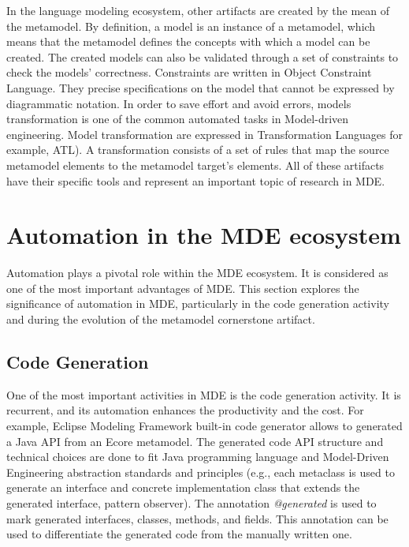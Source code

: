 In the language modeling ecosystem, other artifacts are created by the mean of the metamodel. By definition, a model is an instance of a metamodel, which means that the metamodel defines the concepts with which a model can be created. The created models can also be validated through a set of constraints to check the models' correctness. Constraints are written in Object Constraint Language. They precise specifications on the model that cannot be  expressed by diagrammatic notation. In order to save effort and avoid errors, models transformation is one of the common automated tasks in Model-driven engineering. Model transformation are expressed in  Transformation Languages for example, ATL). A transformation consists of a set of rules that map the source metamodel elements to the metamodel target’s elements. All of these artifacts have their specific tools and represent an important topic of research in MDE.


\section{Automation in the MDE ecosystem}
\label{mde_automation}
 Automation plays a pivotal role within the MDE ecosystem. It is considered as one of the most important advantages of MDE. This section explores the significance of automation in MDE, particularly in the code generation activity and during the evolution of the metamodel cornerstone artifact.
 

\subsection{Code Generation}

One of the most important activities in MDE is the code generation activity. It is recurrent, and its automation enhances the productivity and the cost. For example, Eclipse Modeling Framework built-in code generator allows to generated a Java API from an Ecore metamodel. The generated code API structure and technical choices are done to fit Java programming language and Model-Driven Engineering abstraction standards and principles (e.g., each metaclass is used to generate an interface and concrete implementation class that extends the generated interface, pattern observer).
 The annotation \textit{@generated} is used to mark generated interfaces, classes, methods, and fields. This annotation can be used to differentiate the generated code from the manually written one.

